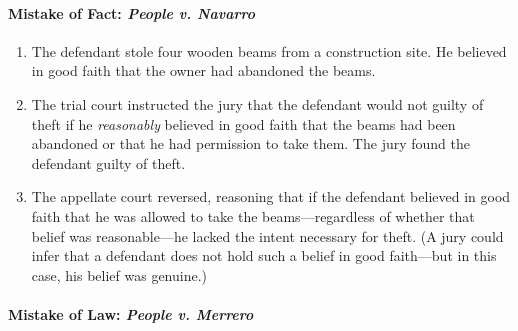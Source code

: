\paragraph{Mistake of Fact: \emph{People v. Navarro}}

\begin{enumerate}
    \item The defendant stole four wooden beams from a construction site. He believed in good faith that the owner had abandoned the beams.
    \item The trial court instructed the jury that the defendant would not guilty of theft if he \emph{reasonably} believed in good faith that the beams had been abandoned or that he had permission to take them. The jury found the defendant guilty of theft.
    \item The appellate court reversed, reasoning that if the defendant believed in good faith that he was allowed to take the beams---regardless of whether that belief was reasonable---he lacked the intent necessary for theft. (A jury could infer that a defendant does not hold such a belief in good faith---but in this case, his belief was genuine.)
\end{enumerate}

\paragraph{Mistake of Law: \emph{People v. Merrero}}

